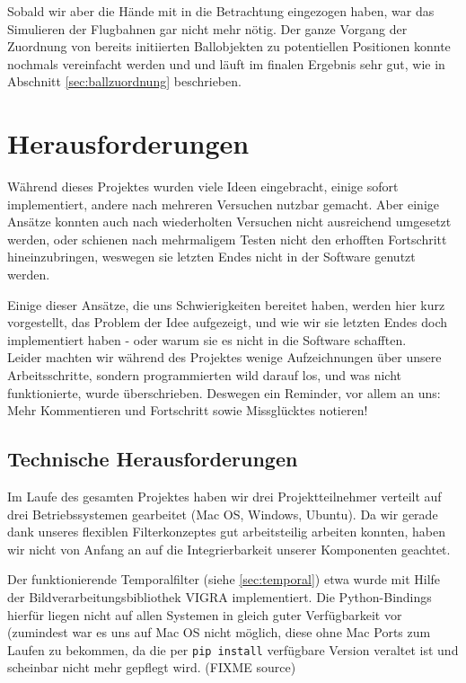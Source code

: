 \documentclass[12pt,a4paper,ngerman]{scrartcl}
\begin{document}
Sobald wir aber die Hände mit in die Betrachtung eingezogen haben, war das Simulieren der Flugbahnen gar nicht mehr nötig. Der ganze Vorgang der Zuordnung von bereits initiierten Ballobjekten zu potentiellen Positionen konnte nochmals vereinfacht werden und und läuft im finalen Ergebnis sehr gut, wie in Abschnitt \ref{sec:ballzuordnung} beschrieben.




\section{Herausforderungen}
Während dieses Projektes wurden viele Ideen eingebracht, einige sofort implementiert, andere nach mehreren Versuchen nutzbar gemacht. Aber einige Ansätze konnten auch nach wiederholten Versuchen nicht ausreichend umgesetzt werden, oder schienen nach mehrmaligem Testen nicht den erhofften Fortschritt hineinzubringen, weswegen sie letzten Endes nicht in der Software genutzt werden.

Einige dieser Ansätze, die uns Schwierigkeiten bereitet haben, werden hier kurz vorgestellt, das Problem der Idee aufgezeigt, und wie wir sie letzten Endes doch implementiert haben - oder warum sie es nicht in die Software schafften.\\
Leider machten wir während des Projektes wenige Aufzeichnungen über unsere Arbeitsschritte, sondern programmierten wild darauf los, und was nicht funktionierte, wurde überschrieben. Deswegen ein Reminder, vor allem an uns: Mehr Kommentieren und Fortschritt sowie Missglücktes notieren!


\subsection{Technische Herausforderungen}

Im Laufe des gesamten Projektes haben wir drei Projektteilnehmer verteilt auf drei
Betriebssystemen gearbeitet (Mac OS, Windows, Ubuntu). Da wir gerade dank
unseres flexiblen Filterkonzeptes gut arbeitsteilig arbeiten konnten, haben wir
nicht von Anfang an auf die Integrierbarkeit unserer Komponenten geachtet.

Der funktionierende Temporalfilter (siehe \ref{sec:temporal}) etwa wurde mit Hilfe
der Bildverarbeitungsbibliothek VIGRA\cite{vigra} implementiert. Die
Python-Bindings hierfür liegen nicht auf allen Systemen in gleich guter Verfügbarkeit
vor (zumindest war es uns auf Mac OS nicht möglich, diese ohne Mac Ports zum Laufen
zu bekommen, da die per \lstinline{pip install} verfügbare Version veraltet ist und
scheinbar nicht mehr gepflegt wird. (FIXME source)
\end{document}
